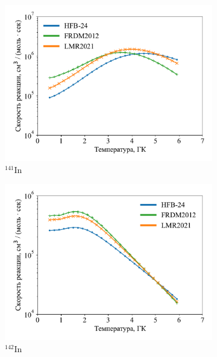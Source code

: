 \begin{figure}
  \centering
  \begin{subfigure}{0.48\textwidth}
    \centering
    \includegraphics[width=\textwidth]{pics/n_in141.pdf}
    \caption{${}^{141}$In}
  \end{subfigure}
  \hfill
  \begin{subfigure}{0.48\textwidth}
    \centering
    \includegraphics[width=\textwidth]{pics/n_in142.pdf}
    \caption{${}^{142}$In}
  \end{subfigure}
  \\
  \begin{subfigure}{0.48\textwidth}
    \centering

\end{subfigure}
\end{figure}
